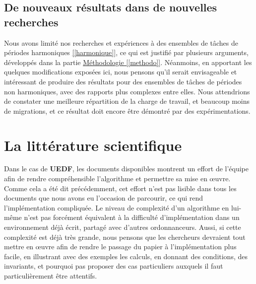 	\subsection{De nouveaux résultats dans de nouvelles recherches}
	
	Nous avons limité nos recherches et expériences à des ensembles de tâches de périodes harmoniques \hyperref[harmonique]{[\ref{harmonique}]}, 
	ce qui est justifié par plusieurs arguments, développés dans la partie \hyperref[methodo]{Méthodologie [\ref*{methodo}]}.
	Néanmoins, en apportant les quelques modifications exposées ici, nous pensons qu'il serait envisageable et intéressant 
	de produire des résultats pour des ensembles de tâches 
	de périodes non harmoniques, avec des rapports plus complexes entre elles. Nous attendrions de constater 
	une meilleure répartition de la charge de travail, et beaucoup moins de migrations, et ce résultat doit encore 
	être démontré par des expérimentations.

\section{La littérature scientifique}

	Dans le cas de \textbf{UEDF}, les documents disponibles montrent un effort de l'équipe afin de rendre compréhensible 
	l'algorithme et permettre sa mise en œuvre. Comme cela a été dit précédemment, cet effort n'est pas lisible dans tous les 
	documents que nous avons eu l'occasion de parcourir, ce qui rend l'implémentation compliquée. Le niveau de complexité 
	d'un algorithme en lui-même n'est pas forcément équivalent à la difficulté d'implémentation dans un environnement 
	déjà écrit, partagé avec d'autres ordonnanceurs. Aussi, si cette complexité est déjà très grande, nous pensons que les 
	chercheurs devraient tout mettre en œuvre afin de rendre le passage du papier à l'implémentation plus facile, en illustrant 
	avec des exemples les calculs, en donnant des conditions, des invariants, et pourquoi pas proposer des cas particuliers 
	auxquels il faut particulièrement être attentifs. \newline
	

